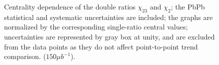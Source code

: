 \begin{figure}[hbtp]
  \begin{center}
    \caption{Centrality dependence of the double ratios $\chi_{23}$ and $\chi_{2}$;  %
the PbPb statistical and systematic uncertainties are included; the graphs are normalized by the corresponding \pp single-ratio central values; \pp uncertainties are represented by gray box at unity, and are excluded from the data points as they do not affect point-to-point trend comparison. ($150 \mu b^{-1}$).}
    \label{fig:final_singlerat_centrality_nominal}
  \end{center}
\end{figure}

